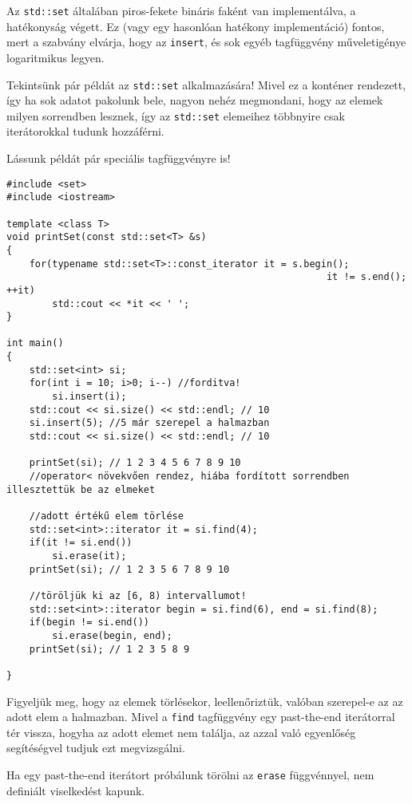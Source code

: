 \documentclass[a4paper,11.5pt,table]{article}
\begin{document}
	\begin{note}
		Az \texttt{std::set} általában piros-fekete bináris faként van implementálva, a hatékonyság végett. Ez (vagy egy hasonlóan hatékony implementáció) fontos, mert a szabvány elvárja, hogy az \texttt{insert}, és sok egyéb tagfüggvény műveletigénye logaritmikus legyen.
	\end{note}
	Tekintsünk pár példát az \texttt{std::set} alkalmazására! Mivel ez a konténer rendezett, így ha sok adatot pakolunk bele, nagyon nehéz megmondani, hogy az elemek milyen sorrendben lesznek, így az \texttt{std::set} elemeihez többnyire csak iterátorokkal tudunk hozzáférni.
	
	Lássunk példát pár speciális tagfüggvényre is!
\begin{lstlisting}
#include <set>
#include <iostream>

template <class T>
void printSet(const std::set<T> &s)
{
	for(typename std::set<T>::const_iterator it = s.begin(); 
													    it != s.end(); ++it)
		std::cout << *it << ' ';
}

int main()
{
	std::set<int> si; 
	for(int i = 10; i>0; i--) //forditva!
		si.insert(i);
	std::cout << si.size() << std::endl; // 10
	si.insert(5); //5 már szerepel a halmazban
	std::cout << si.size() << std::endl; // 10
	
	printSet(si); // 1 2 3 4 5 6 7 8 9 10
	//operator< növekvően rendez, hiába fordított sorrendben illesztettük be az elmeket
	
	//adott értékű elem törlése
	std::set<int>::iterator it = si.find(4);
	if(it != si.end())
		si.erase(it);
	printSet(si); // 1 2 3 5 6 7 8 9 10
	
	//töröljük ki az [6, 8) intervallumot!
	std::set<int>::iterator begin = si.find(6), end = si.find(8);
	if(begin != si.end())
		si.erase(begin, end);
	printSet(si); // 1 2 3 5 8 9
	
}
\end{lstlisting}
	Figyeljük meg, hogy az elemek törlésekor, leellenőriztük, valóban szerepel-e az az adott elem a halmazban. Mivel a \texttt{find} tagfüggvény egy past-the-end iterátorral tér vissza, hogyha az adott elemet nem találja, az azzal való egyenlőség segítéségvel tudjuk ezt megvizsgálni.
	
	Ha egy past-the-end iterátort próbálunk törölni az \texttt{erase} függvénnyel, nem definiált viselkedést kapunk.
	
\end{document}
